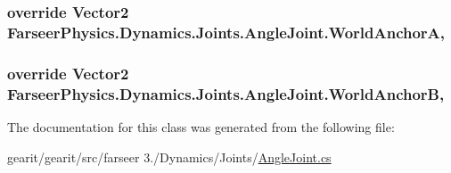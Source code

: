 \hypertarget{class_farseer_physics_1_1_dynamics_1_1_joints_1_1_angle_joint_a746ea8907dc1b6603ebaa78c293d350b}{
\subsubsection[{World\+Anchor\+A}]{\setlength{\rightskip}{0pt plus 5cm}override Vector2 Farseer\+Physics.\+Dynamics.\+Joints.\+Angle\+Joint.\+World\+Anchor\+A\hspace{0.3cm}{\ttfamily [get]}, {\ttfamily [set]}}}\label{class_farseer_physics_1_1_dynamics_1_1_joints_1_1_angle_joint_a746ea8907dc1b6603ebaa78c293d350b}
\hypertarget{class_farseer_physics_1_1_dynamics_1_1_joints_1_1_angle_joint_a5b13e62b4d20eee9f5d6e2aebc826d3d}{
\subsubsection[{World\+Anchor\+B}]{\setlength{\rightskip}{0pt plus 5cm}override Vector2 Farseer\+Physics.\+Dynamics.\+Joints.\+Angle\+Joint.\+World\+Anchor\+B\hspace{0.3cm}{\ttfamily [get]}, {\ttfamily [set]}}}\label{class_farseer_physics_1_1_dynamics_1_1_joints_1_1_angle_joint_a5b13e62b4d20eee9f5d6e2aebc826d3d}


The documentation for this class was generated from the following file\+:\begin{DoxyCompactItemize}
\item 
gearit/gearit/src/farseer 3./\+Dynamics/\+Joints/\hyperlink{_angle_joint_8cs}{Angle\+Joint.\+cs}\end{DoxyCompactItemize}
